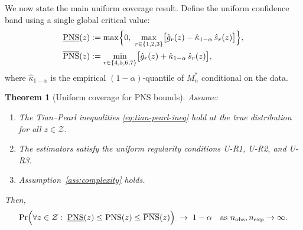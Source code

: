 \documentclass[accepted]{uai2026} %
\theoremstyle{plain}
\newtheorem{theorem}{Theorem}[section]
\theoremstyle{definition}
\theoremstyle{remark}
\begin{document}
We now state the main uniform coverage result. Define the uniform confidence
band using a single global critical value:
\begin{align}
  \underline{\mathrm{PNS}}(z)
  &:= \max\Bigl\{
    0,\
    \max_{r \in \{1,2,3\}}
      \bigl[\hat g_r(z) - \hat\kappa_{1-\alpha}\,\hat s_r(z)\bigr]
  \Bigr\}, \label{eq:uniform-lower}\\
  \overline{\mathrm{PNS}}(z)
  &:= \min_{r \in \{4,5,6,7\}}
      \bigl[\hat g_r(z) + \hat\kappa_{1-\alpha}\,\hat s_r(z)\bigr], \label{eq:uniform-upper}
\end{align}
where $\hat\kappa_{1-\alpha}$ is the empirical $(1-\alpha)$-quantile of
$M_n^*$ conditional on the data.

\begin{theorem}[Uniform coverage for PNS bounds]
\label{thm:uniform-pns}
Assume:
\begin{enumerate}
  \item[(i)] The Tian--Pearl inequalities \eqref{eq:tian-pearl-ineq} hold at
  the true distribution for all $z \in \mathcal{Z}$.
  
  \item[(ii)] The estimators satisfy the uniform regularity conditions
  U-R1, U-R2, and U-R3.
  
  \item[(iii)] Assumption~\ref{ass:complexity} holds.
\end{enumerate}
Then,
\begin{equation}
\label{eq:uniform-coverage}
  \Pr\Bigl(
    \forall z \in \mathcal{Z}:\;
    \underline{\mathrm{PNS}}(z)
    \le \mathrm{PNS}(z)
    \le \overline{\mathrm{PNS}}(z)
  \Bigr)
  \;\to\; 1 - \alpha
  \quad \text{as } n_{\mathrm{obs}}, n_{\mathrm{exp}} \to \infty.
\end{equation}
\end{theorem}
\end{document}
